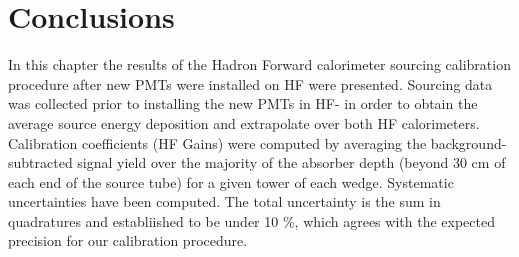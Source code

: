 \section{Conclusions}
In this chapter the results of the Hadron Forward calorimeter sourcing calibration procedure after new PMTs were installed on HF were presented. Sourcing data was collected prior to installing the new PMTs in HF- in order to obtain the average source energy deposition and extrapolate over both HF calorimeters. Calibration coefficients (HF Gains) were computed by averaging the background-subtracted signal yield over the majority of the absorber depth (beyond 30 cm of each end of the source tube) for a given tower of each wedge. Systematic uncertainties have been computed. The total uncertainty is the sum in quadratures and establiished to be under 10 \%, which agrees with the expected precision for our calibration procedure.